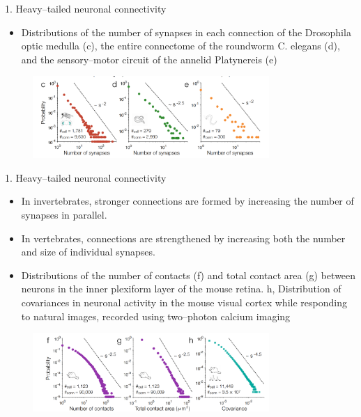 \documentclass[
  notheorems,
  aspectratio=54,
]{beamer}
\begin{document}
\begin{frame}{1. Heavy–tailed neuronal connectivity}
  \begin{itemize}
   \item  Distributions of the number of
synapses in each connection of the Drosophila optic medulla (c), the entire connectome of the roundworm
C. elegans (d), and the sensory–motor circuit of the annelid Platynereis (e)
  \end{itemize}
  \begin{figure}
    \centering
    \includegraphics[width=0.8\textwidth]{./screenshot/3.png}
  \end{figure}
\end{frame}

\begin{frame}{1. Heavy–tailed neuronal connectivity}
  \begin{itemize}
    \item In invertebrates, stronger connections are formed by increasing the number of synapses in parallel.
    \item In vertebrates, connections are strengthened by increasing both the number and size of individual synapses.
    \item Distributions of the
number of contacts (f) and total contact area (g) between neurons in the inner plexiform layer of the mouse
retina. h, Distribution of covariances in neuronal activity in the mouse visual cortex while responding to
natural images, recorded using two–photon calcium imaging
  \end{itemize}
  \begin{figure}
    \centering
    \includegraphics[width=0.8\textwidth]{./screenshot/4.png}
  \end{figure}
\end{frame}
\end{document}

